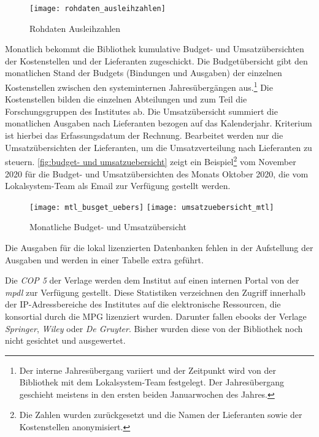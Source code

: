 \begin{figure}[H]
    \centering
        \texttt{[image: rohdaten\_ausleihzahlen]}
        \caption{Rohdaten Ausleihzahlen}
        \label{fig:Titelausleihen}
\end{figure}


Monatlich bekommt die Bibliothek kumulative Budget- und Umsatzübersichten der Kostenstellen und der Lieferanten zugeschickt.
Die Budgetübersicht gibt den monatlichen Stand der Budgets (Bindungen und Ausgaben) der einzelnen Kostenstellen zwischen den systeminternen Jahresübergängen aus.\footnote{Der
interne Jahresübergang variiert und der Zeitpunkt wird von der Bibliothek mit dem Lokalsystem-Team festgelegt. Der Jahresübergang geschieht meistens in den ersten beiden Januarwochen des Jahres.}
Die Kostenstellen bilden die einzelnen Abteilungen und zum Teil die Forschungsgruppen des Institutes ab.
Die Umsatzübersicht summiert die monatlichen Ausgaben nach Lieferanten bezogen auf das Kalenderjahr. Kriterium ist hierbei das Erfassungsdatum der Rechnung. 
Bearbeitet werden nur die Umsatzübersichten der Lieferanten, um die Umsatzverteilung nach Lieferanten zu steuern.
\autoref{fig:budget- und umsatzuebersicht} zeigt ein Beispiel\footnote{Die Zahlen wurden zurückgesetzt und die Namen der Lieferanten sowie der Kostenstellen anonymisiert.} vom November 2020 für die Budget- und Umsatzübersichten des Monats Oktober 2020, die vom Lokalsystem-Team als Email zur Verfügung gestellt werden.


\begin{figure}[h]
    \centering
        \texttt{[image: mtl\_busget\_uebers]}
        \texttt{[image: umsatzuebersicht\_mtl]}
        \caption{Monatliche Budget- und Umsatzübersicht}
        \label{fig:budget- und umsatzuebersicht}
\end{figure}

Die Ausgaben für die lokal lizenzierten Datenbanken fehlen in der Aufstellung der Ausgaben und werden in einer Tabelle extra geführt.

Die \textit{\acrfull{COP 5}} der Verlage werden dem Institut auf einen internen Portal von der \textit{\acrshort{mpdl}} zur Verfügung gestellt.
Diese Statistiken verzeichnen den Zugriff innerhalb der IP-Adressbereiche des Institutes auf die elektronische Ressourcen, 
die konsortial durch die \acrshort{MPG} lizenziert wurden. Darunter fallen ebooks der Verlage 
\textit{Springer}, \textit{Wiley} oder \textit{De Gruyter}. Bisher wurden diese von der Bibliothek noch nicht gesichtet und ausgewertet.

